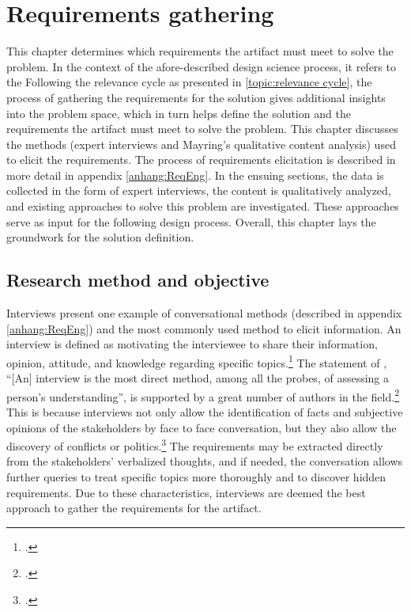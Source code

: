 \chapter{Requirements gathering} \label{chap:ReqEng}

This chapter determines which requirements the artifact must meet to solve the problem. In the context of the afore-described design science process, it refers to the  Following the relevance cycle as presented in \ref{topic:relevance cycle}, the process of gathering the requirements for the solution gives additional insights into the problem space, which in turn helps define the solution and the requirements the artifact must meet to solve the problem. This chapter discusses the methods (expert interviews and Mayring's qualitative content analysis) used to elicit the requirements. The process of requirements elicitation is described in more detail in appendix \ref{anhang:ReqEng}. In the ensuing sections, the data is collected in the form of expert interviews, the content is qualitatively analyzed, and existing approaches to solve this problem are investigated. These approaches serve as input for the following design process. Overall, this chapter lays the groundwork for the solution definition.

\section{Research method and objective}
Interviews present one example of conversational methods (described in appendix \ref{anhang:ReqEng}) and the most commonly used method to elicit information. An interview is defined as motivating the interviewee to share their information, opinion, attitude, and knowledge regarding specific topics.\footcite[Cf.][p.133]{KrugerqualitativeInhaltsanalyseMethode2004} The statement of \cite{WhiteProbingunderstanding1992}, \enquote{[An] interview is the most direct method, among all the probes, of assessing a person’s understanding}, is supported by a great number of authors in the field.\footcites[Cf.][p.174]{MacaulayRequirementscapturecooperative1993}[cf.][p.105]{SommervilleSoftwareengineering2011}[cf.][p.25]{ZowghiRequirementselicitationsurvey2005}[cf.][p.172]{HickeyElicitationtechniqueselection2003}[cf.][p.227]{ZhangEffectiverequirementsdevelopmentA2007}[cf.][p.92]{MasonQualitativeresearching2002} This is because interviews not only allow the identification of facts and subjective opinions of the stakeholders by face to face conversation, but they also allow the discovery of conflicts or politics.\footcites[Cf.][p.2]{TiwariMethodologySelectionRequirement2017} The requirements may be extracted directly from the stakeholders' verbalized thoughts, and if needed, the conversation allows further queries to treat specific topics more thoroughly and to discover hidden requirements. Due to these characteristics, interviews are deemed the best approach to gather the requirements for the artifact.

